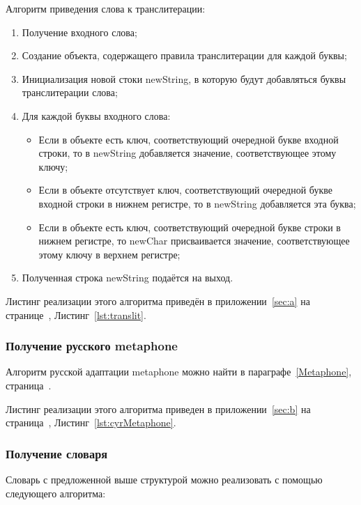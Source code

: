 Алгоритм приведения слова к транслитерации:

\begin{enumerate}
  \item Получение входного слова;
  \item Создание объекта, содержащего правила транслитерации для каждой буквы;
  \item Инициализация новой стоки newString, в которую будут добавляться буквы транслитерации слова;
  \item Для каждой буквы входного слова:
   \begin{itemize}
    \item Если в объекте есть ключ, соответствующий очередной букве входной строки, то в newString добавляется значение, соответствующее этому ключу;
    \item Если в объекте отсутствует ключ, соответствующий очередной букве входной строки в нижнем регистре, то в newString добавляется эта буква;
    \item Если в объекте есть ключ, соответствующий очередной букве строки в нижнем регистре, то newChar присваивается значение, соответствующее этому ключу в верхнем регистре;
  \end{itemize}
  \item Полученная строка newString подаётся на выход.
\end{enumerate}

Листинг реализации этого алгоритма приведён в приложении~\ref{sec:a} на странице~\pageref{lst:translit}, Листинг~\ref{lst:translit}.

\subsubsection{Получение русского metaphone}

Алгоритм русской адаптации metaphone можно найти в параграфе~\ref{Metaphone}, страница~\pageref{Metaphone}.

Листинг реализации этого алгоритма приведен в приложении~\ref{sec:b} на страница~\pageref{lst:cyrMetaphone}, Листинг~\ref{lst:cyrMetaphone}.

\subsubsection{Получение словаря}

Словарь с предложенной выше структурой можно реализовать с помощью следующего алгоритма:

